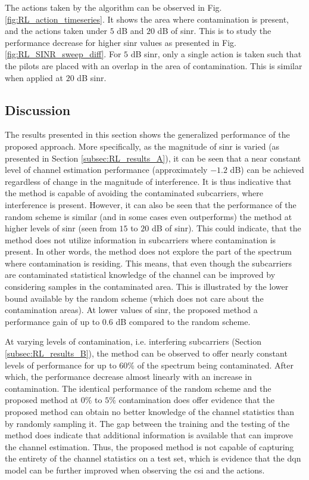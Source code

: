 The actions taken by the algorithm can be observed in Fig. \ref{fig:RL_action_timeseries}. It shows the area where contamination is present, and the actions taken under $5$ dB and $20$ dB of \gls{sinr}. This is to study the performance decrease for higher \gls{sinr} values as presented in Fig. \ref{fig:RL_SINR_sweep_diff}. For $5$ dB \gls{sinr}, only a single action is taken such that the pilots are placed with an overlap in the area of contamination. This is similar when applied at $20$ dB \gls{sinr}.





\subsection{Discussion}\label{sec:RL_discussion}
The results presented in this section shows the generalized performance of the proposed approach. More specifically, as the magnitude of \gls{sinr} is varied (as presented in Section \ref{subsec:RL_results_A}), it can be seen that a near constant level of channel estimation performance (approximately $-1.2$ dB) can be achieved regardless of change in the magnitude of interference. It is thus indicative that the method is capable of avoiding the contaminated subcarriers, where interference is present. However, it can also be seen that the performance of the random scheme is similar (and in some cases even outperforms) the method at higher levels of \gls{sinr} (seen from $15$ to $20$ dB of \gls{sinr}). This could indicate, that the method does not utilize information in subcarriers where contamination is present. In other words, the method does not explore the part of the spectrum where contamination is residing. This means, that even though the subcarriers are contaminated statistical knowledge of the channel can be improved by considering samples in the contaminated area. This is illustrated by the lower bound available by the random scheme (which does not care about the contamination areas). At lower values of \gls{sinr}, the proposed method a performance gain of up to $0.6$ dB compared to the random scheme. 

At varying levels of contamination, i.e. interfering subcarriers (Section \ref{subsec:RL_results_B}), the method can be observed to offer nearly constant levels of performance for up to $60\%$ of the spectrum being contaminated. After which, the performance decrease almost linearly with an increase in contamination. The identical performance of the random scheme and the proposed method at $0\%$ to $5\%$ contamination does offer evidence that the proposed method can obtain no better knowledge of the channel statistics than by randomly sampling it. The gap between the training and the testing of the method does indicate that additional information is available that can improve the channel estimation. Thus, the proposed method is not capable of capturing the entirety of the channel statistics on a test set, which is evidence that the \gls{dqn} model can be further improved when observing the \gls{csi} and the actions. 

